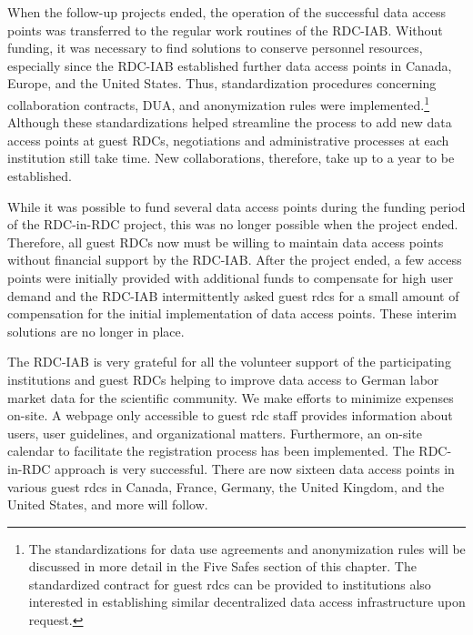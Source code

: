 When the follow-up projects ended, the operation of the successful data access points was transferred to the regular work routines of the RDC-IAB. Without funding, it was necessary to find solutions to conserve personnel resources, especially since the RDC-IAB established further data access points in Canada, Europe, and the United States. Thus, standardization procedures concerning collaboration contracts, DUA, and anonymization rules were implemented.\footnote{The standardizations for data use agreements and anonymization rules will be discussed in more detail in the Five Safes section of this chapter. The standardized contract for guest rdcs can be provided to institutions also interested in establishing similar decentralized data access infrastructure upon request.} Although these standardizations helped streamline the process to add new data access points at guest RDCs, negotiations and administrative processes at each institution still take time. New collaborations, therefore, take up to a year to be established.

While it was possible to fund several data access points during the funding period of the RDC-in-RDC project, this was no longer possible when the project ended. Therefore, all guest RDCs now must be willing to maintain data access points without financial support by the RDC-IAB. After the project ended, a few access points were initially provided with additional funds to compensate for high user demand and the RDC-IAB intermittently asked guest rdcs for a small amount of compensation for the initial implementation of data access points. These interim solutions are no longer in place.

The RDC-IAB is very grateful for all the volunteer support of the participating institutions and guest RDCs helping to improve data access to German labor market data for the scientific community. We make efforts to minimize expenses on-site. A webpage only accessible to guest rdc staff provides information about users, user guidelines, and organizational matters. Furthermore, an on-site calendar to facilitate the registration process has been implemented. The RDC-in-RDC approach is very successful. There are now sixteen data access points in various guest rdcs in Canada, France, Germany, the United Kingdom, and the United States, and more will follow.

